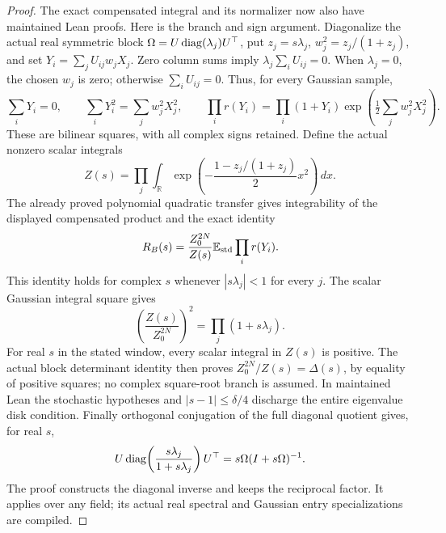 \begin{proof}
The exact compensated integral and its normalizer now also have maintained
Lean proofs. Here is the branch and sign argument. Diagonalize the actual
real symmetric block \(\Omega=U\operatorname{diag}(\lambda_j)U^\top\), put
\(z_j=s\lambda_j\), \(w_j^2=z_j/(1+z_j)\), and set
\(Y_i=\sum_jU_{ij}w_jX_j\). Zero column sums imply
\(\lambda_j\sum_iU_{ij}=0\). When \(\lambda_j=0\), the chosen
\(w_j\) is zero; otherwise \(\sum_iU_{ij}=0\).
Thus, for every Gaussian sample,
\[
 \sum_iY_i=0,\qquad \sum_iY_i^2=\sum_jw_j^2X_j^2,\qquad
 \prod_i r(Y_i)=\prod_i(1+Y_i)
                   \exp\!\left(\tfrac12\sum_jw_j^2X_j^2\right).
\]
These are bilinear squares, with all complex signs retained.
Define the actual nonzero scalar integrals
\[
 Z(s)=\prod_j\int_{\mathbb R}
     \exp\!\left(-\frac{1-z_j/(1+z_j)}2x^2\right)\,dx.
\]
The already proved polynomial quadratic transfer gives integrability
of the displayed compensated product and the exact identity
\[
 R_B(s)=\frac{Z_0^{2N}}{Z(s)}
                  \mathbb E_{\rm std}\prod_i r(Y_i).
\]
This identity holds for complex \(s\) whenever \(|s\lambda_j|<1\)
for every \(j\). The scalar Gaussian integral square gives
\[
 \left(\frac{Z(s)}{Z_0^{2N}}\right)^2
                           =\prod_j(1+s\lambda_j).
\]
For real \(s\) in the stated window, every scalar integral in \(Z(s)\)
is positive. The actual block determinant identity then proves
\(Z_0^{2N}/Z(s)=\Delta(s)\), by equality of positive squares;
no complex square-root branch is assumed. In maintained Lean the
stochastic hypotheses and \(|s-1|\leq\delta/4\) discharge the entire
eigenvalue disk condition. Finally orthogonal conjugation of the full
diagonal quotient gives, for real \(s\),
\[
 U\operatorname{diag}\!\left(\frac{s\lambda_j}{1+s\lambda_j}\right)U^\top
                              =s\Omega(I+s\Omega)^{-1}.
\]
The proof constructs the diagonal inverse and keeps the reciprocal factor.
It applies over any field; its actual real spectral and Gaussian entry
specializations are compiled.


\end{proof}
